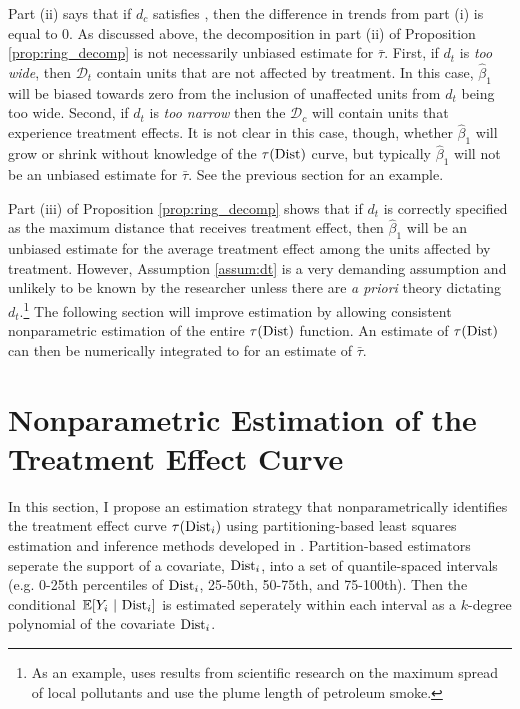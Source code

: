 Part (ii) says that if $d_c$ satisfies , then the difference in trends from part (i) is equal to 0. As discussed above, the decomposition in part (ii) of Proposition \ref{prop:ring_decomp} is not necessarily unbiased estimate for $\bar{\tau}$. First, if $d_t$ is \textit{too wide}, then $\mathcal{D}_t$ contain units that are not affected by treatment. In this case, $\hat{\beta}_1$ will be biased towards zero from the inclusion of unaffected units from $d_t$ being too wide. Second, if $d_t$ is \textit{too narrow} then the $\mathcal{D}_c$ will contain units that experience treatment effects. It is not clear in this case, though, whether $\hat{\beta}_1$ will grow or shrink without knowledge of the $\tau(\text{Dist})$ curve, but typically $\hat{\beta}_1$ will not be an unbiased estimate for $\bar{\tau}$. See the previous section for an example.  

Part (iii) of Proposition \ref{prop:ring_decomp} shows that if $d_t$ is correctly specified as the maximum distance that receives treatment effect, then $\hat{\beta}_1$ will be an unbiased estimate for the average treatment effect among the units affected by treatment. However, Assumption \ref{assum:dt} is a very demanding assumption and unlikely to be known by the researcher unless there are \textit{a priori} theory dictating $d_t$.\footnote{As an example, \citet{Currie_Davis_Greenstone_Walker_2015} uses results from scientific research on the maximum spread of local pollutants and \citet{Marcus_2021} use the plume length of petroleum smoke.} The following section will improve estimation by allowing consistent nonparametric estimation of the entire $\tau(\text{Dist})$ function. An estimate of $\tau(\text{Dist})$ can then be numerically integrated to for an estimate of $\bar{\tau}$.



\section{Nonparametric Estimation of the Treatment Effect Curve}\label{sec:lspartition}

In this section, I propose an estimation strategy that nonparametrically identifies the treatment effect curve $\tau(\text{Dist}_i)$ using partitioning-based least squares estimation and inference methods developed in \citet{cattaneo2019binscatter, Cattaneo_Farrell_Feng_2019}. Partition-based estimators seperate the support of a covariate, $\text{Dist}_i$, into a set of quantile-spaced intervals (e.g. 0-25th percentiles of $\text{Dist}_i$, 25-50th, 50-75th, and 75-100th). Then the conditional $\expec{Y_i}{\dist_i}$ is estimated seperately within each interval as a $k$-degree polynomial of the covariate $\text{Dist}_i$.

